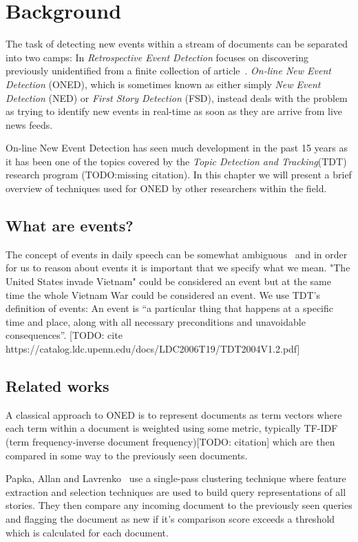 \chapter{Background}
\label{chapter:background}

The task of detecting new events within a stream of documents can be separated into two camps: In \emph{Retrospective Event Detection} focuses on discovering previously unidentified from a finite collection of article~\cite{yang198study}. \emph{On-line New Event Detection} (ONED), which is sometimes known as either simply \emph{New Event Detection} (NED) or \emph{First Story Detection} (FSD), instead deals with the problem as trying to identify new events in real-time as soon as they are arrive from live news feeds.

On-line New Event Detection has seen much development in the past 15 years as it has been one of the topics covered by the \emph{Topic Detection and Tracking}(TDT) research program (TODO:missing citation). In this chapter we will present a brief overview of techniques used for ONED by other researchers within the field.

\section{What are events?}
The concept of events in daily speech can be somewhat ambiguous~\cite{papka1999online} and in order for us to reason about events it is important that we specify what we mean. "The United States invade Vietnam" could be considered an event but at the same time the whole Vietnam War could be considered an event. We use TDT's definition of events: An event is ``a particular thing that happens at a specific time and place, along with all necessary preconditions and unavoidable consequences''. [TODO: cite https://catalog.ldc.upenn.edu/docs/LDC2006T19/TDT2004V1.2.pdf]

\section{Related works}
A classical approach to ONED is to represent documents as term vectors where each term within a document is weighted using some metric, typically TF-IDF (term frequency-inverse document frequency)[TODO: citation] which are then compared in some way to the previously seen documents.

Papka, Allan and Lavrenko~\cite{papka1998online} use a single-pass clustering technique where feature extraction and selection techniques are used to build query representations of all stories. They then compare any incoming document to the previously seen queries and flagging the document as new if it's comparison score exceeds a threshold which is calculated for each document.


